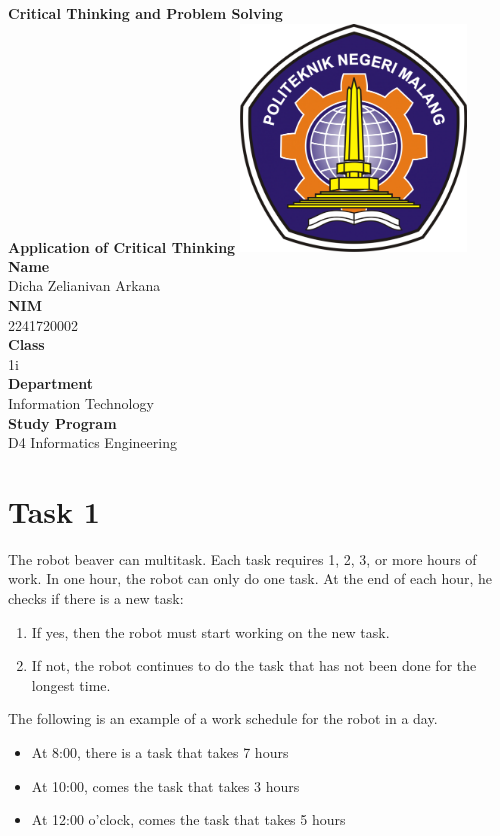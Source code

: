 \documentclass[12pt,titlepage]{article}
\newcommand{\vSubject}{Critical Thinking and Problem Solving}
\newcommand{\vSubtitle}{Application of Critical Thinking}
\newcommand{\vName}{Dicha Zelianivan Arkana}
\newcommand{\vNIM}{2241720002}
\newcommand{\vClass}{1i}
\newcommand{\vDepartment}{Information Technology}
\newcommand{\vStudyProgram}{D4 Informatics Engineering}
\begin{document}
\begin{titlepage}
    \centering
    \vfill
    {\bfseries\LARGE
        \vSubject\\
        \vskip0.25cm
        \vSubtitle
    }
    \vfill
    \includegraphics[width=6cm]{images/polinema-logo.png}
    \vfill
    {
        \textbf{Name}\\
        \vName\\
        \vskip0.5cm
        \textbf{NIM}\\
        \vNIM\\
        \vskip0.5cm
        \textbf{Class}\\
        \vClass\\
        \vskip0.5cm
        \textbf{Department}\\
        \vDepartment\\
        \vskip0.5cm
        \textbf{Study Program}\\
        \vStudyProgram
    }
\end{titlepage}

\section*{Task 1}
The robot beaver can multitask. Each task requires 1, 2, 3, or more hours of work. In one hour, the robot can only do one
task. At the end of each hour, he checks if there is a new task:
\begin{enumerate}
    \item If yes, then the robot must start working on the new task.
    \item If not, the robot continues to do the task that has not been done for the longest time.
\end{enumerate}

The following is an example of a work schedule for the robot in a day.

\begin{itemize}
    \item At 8:00, there is a task that takes 7 hours
    \item At 10:00, comes the task that takes 3 hours
    \item At 12:00 o'clock, comes the task that takes 5 hours
\end{itemize}
\end{document}
